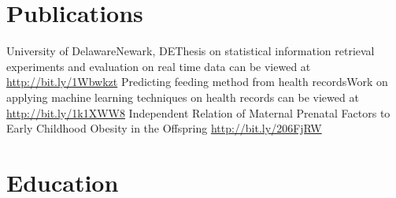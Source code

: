\documentclass[10pt,a4paper,sans]{moderncv}        %
\begin{document}
\section{Publications}

 {University of Delaware}{Newark, DE}{}{Thesis on statistical information retrieval experiments and evaluation on real time data can be viewed at \url{http://bit.ly/1Wbwkzt}}
 {}{}{Predicting feeding method from health records}{Work on applying machine learning techniques on health records can be viewed at \url{http://bit.ly/1k1XWW8}}
 {}{}{}{Independent Relation of Maternal Prenatal Factors to Early Childhood Obesity in the Offspring \url{http://bit.ly/206FjRW}}

\section{Education}

\nocite{*}


\clearpage
\end{document}

